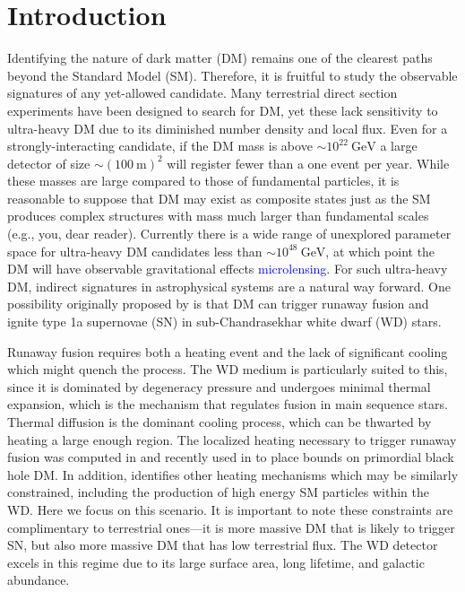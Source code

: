 \documentclass[twocolumn,preprintnumbers,amsmath,amssymb,prd, superscriptaddress]{revtex4} %
\newcommand{\GeV}{\text{GeV}}
\begin{document}
\section{Introduction}
\label{sec:Introduction}

Identifying the nature of dark matter (DM) remains one of the clearest paths beyond the Standard Model (SM).
Therefore, it is fruitful to study the observable signatures of any yet-allowed candidate.
Many terrestrial direct section experiments have been designed to search for DM, yet these lack sensitivity to ultra-heavy DM due to its diminished number density and local flux.
Even for a strongly-interacting candidate, if the DM mass is above $\sim 10^{22} ~\GeV$ a large detector of size $\sim (100 ~\text{m})^2$ will register fewer than a one event per year.
While these masses are large compared to those of fundamental particles, it is reasonable to suppose that DM may exist as composite states just as the SM produces complex structures with mass much larger than fundamental scales (e.g., you, dear reader).
Currently there is a wide range of unexplored parameter space for ultra-heavy DM candidates less than $\sim 10^{48} ~\GeV$, at which point the DM will have observable gravitational effects \textcolor{blue}{microlensing}.
For such ultra-heavy DM, indirect signatures in astrophysical systems are a natural way forward.
One possibility originally proposed by \cite{Graham:2015apa} is that DM can trigger runaway fusion and ignite type 1a supernovae (SN) in sub-Chandrasekhar white dwarf (WD) stars.

Runaway fusion requires both a heating event and the lack of significant cooling which might quench the process.
The WD medium is particularly suited to this, since it is dominated by degeneracy pressure and undergoes minimal thermal expansion, which is the mechanism that regulates fusion in main sequence stars.
Thermal diffusion is the dominant cooling process, which can be thwarted by heating a large enough region.
The localized heating necessary to trigger runaway fusion was computed in \cite{Woosley} and recently used in \cite{Graham:2015apa} to place bounds on primordial black hole DM.
In addition, \cite{Graham:2015apa} identifies other heating mechanisms which may be similarly constrained, including the production of high energy SM particles within the WD.
Here we focus on this scenario.
It is important to note these constraints are complimentary to terrestrial ones---it is more massive DM that is likely to trigger SN, but also more massive DM that has low terrestrial flux.
The WD detector excels in this regime due to its large surface area, long lifetime, and galactic abundance.
\end{document}
